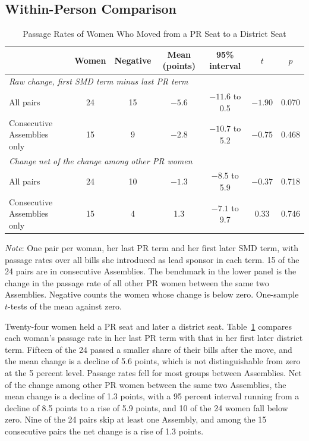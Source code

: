 \documentclass[11pt]{article}
\begin{document}
\subsection{Within-Person Comparison}

\begin{table}[htbp]
\centering
\caption{Passage Rates of Women Who Moved from a PR Seat to a District Seat}
\label{tab:switchers}
\small
\begin{tabular}{lcccccc}
\toprule
& Women & Negative & Mean (points) & 95\% interval & $t$ & $p$ \\
\midrule
\multicolumn{7}{l}{\textit{Raw change, first SMD term minus last PR term}} \\[3pt]
All pairs & 24 & 15 & $-5.6$ & $-11.6$ to 0.5 & $-1.90$ & 0.070 \\
Consecutive Assemblies only & 15 & 9 & $-2.8$ & $-10.7$ to 5.2 & $-0.75$ & 0.468 \\
\midrule
\multicolumn{7}{l}{\textit{Change net of the change among other PR women}} \\[3pt]
All pairs & 24 & 10 & $-1.3$ & $-8.5$ to 5.9 & $-0.37$ & 0.718 \\
Consecutive Assemblies only & 15 & 4 & 1.3 & $-7.1$ to 9.7 & 0.33 & 0.746 \\
\bottomrule
\end{tabular}

\vspace{4pt}
\parbox{0.95\textwidth}{\footnotesize \textit{Note}: One pair per woman, her last PR term and her first later SMD term, with passage rates over all bills she introduced as lead sponsor in each term. 15 of the 24 pairs are in consecutive Assemblies. The benchmark in the lower panel is the change in the passage rate of all other PR women between the same two Assemblies. Negative counts the women whose change is below zero. One-sample $t$-tests of the mean against zero.}
\end{table}

Twenty-four women held a PR seat and later a district seat. Table~\ref{tab:switchers} compares each woman's passage rate in her last PR term with that in her first later district term. Fifteen of the 24 passed a smaller share of their bills after the move, and the mean change is a decline of 5.6 points, which is not distinguishable from zero at the 5 percent level. Passage rates fell for most groups between Assemblies. Net of the change among other PR women between the same two Assemblies, the mean change is a decline of 1.3 points, with a 95 percent interval running from a decline of 8.5 points to a rise of 5.9 points, and 10 of the 24 women fall below zero. Nine of the 24 pairs skip at least one Assembly, and among the 15 consecutive pairs the net change is a rise of 1.3 points.
\end{document}
